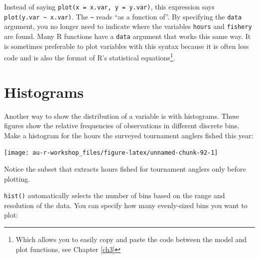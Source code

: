 \documentclass[]{book}
\newenvironment{Shaded}{\begin{snugshade}}{\end{snugshade}}
\newcommand{\KeywordTok}[1]{\textcolor[rgb]{0.13,0.29,0.53}{\textbf{#1}}}
\newcommand{\DataTypeTok}[1]{\textcolor[rgb]{0.13,0.29,0.53}{#1}}
\newcommand{\DecValTok}[1]{\textcolor[rgb]{0.00,0.00,0.81}{#1}}
\newcommand{\StringTok}[1]{\textcolor[rgb]{0.31,0.60,0.02}{#1}}
\newcommand{\CommentTok}[1]{\textcolor[rgb]{0.56,0.35,0.01}{\textit{#1}}}
\newcommand{\OperatorTok}[1]{\textcolor[rgb]{0.81,0.36,0.00}{\textbf{#1}}}
\newcommand{\NormalTok}[1]{#1}
\let\rmarkdownfootnote\footnote%
\def\footnote{\protect\rmarkdownfootnote}
\theoremstyle{definition}
\theoremstyle{definition}
\theoremstyle{definition}
\theoremstyle{remark}
\begin{document}
Instead of saying \texttt{plot(x\ =\ x.var,\ y\ =\ y.var)}, this
expression says \texttt{plot(y.var\ \textasciitilde{}\ x.var)}. The
\texttt{\textasciitilde{}} reads ``as a function of''. By specifying the
\texttt{data} argument, you no longer need to indicate where the
variables \texttt{hours} and \texttt{fishery} are found. Many R
functions have a \texttt{data} argument that works this same way. It is
sometimes preferable to plot variables with this syntax because it is
often less code and is also the format of R's statistical
equations\footnote{Which allows you to easily copy and paste the code
  between the model and plot functions, see Chapter \ref{ch3}}.

\section{Histograms}\label{histograms}

Another way to show the distribution of a variable is with histograms.
These figures show the relative frequencies of observations in different
discrete bins. Make a histogram for the hours the surveyed tournament
anglers fished this year:

\begin{Shaded}
\end{Shaded}

\begin{center}\texttt{[image: au-r-workshop\_files/figure-latex/unnamed-chunk-92-1]} \end{center}

Notice the subset that extracts hours fished for tournament anglers only
before plotting.

\texttt{hist()} automatically selects the number of bins based on the
range and resolution of the data. You can specify how many evenly-sized
bins you want to plot:

\begin{Shaded}
\end{Shaded}
\end{document}
